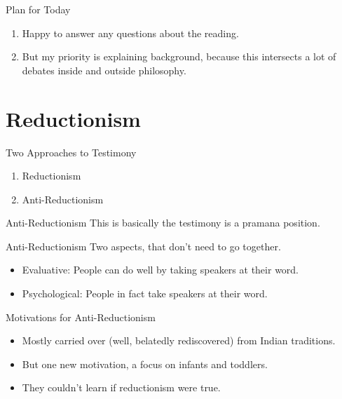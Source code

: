 \documentclass[
  17pt,
  letterpaper,
  ignorenonframetext,
  aspectratio=169,
]{beamer}
\providecommand{\tightlist}{%
  \setlength{\itemsep}{0pt}\setlength{\parskip}{0pt}}\usepackage{longtable,booktabs,array}
\begin{document}
\begin{frame}{Plan for Today}
\protect\hypertarget{plan-for-today}{}
\begin{enumerate}[<+->]
\tightlist
\item
  Happy to answer any questions about the reading.
\item
  But my priority is explaining background, because this intersects a
  lot of debates inside and outside philosophy.
\end{enumerate}
\end{frame}

\hypertarget{reductionism}{%
\section{Reductionism}\label{reductionism}}

\begin{frame}{Two Approaches to Testimony}
\protect\hypertarget{two-approaches-to-testimony}{}
\begin{enumerate}[<+->]
\tightlist
\item
  Reductionism
\item
  Anti-Reductionism
\end{enumerate}
\end{frame}

\begin{frame}{Anti-Reductionism}
\protect\hypertarget{anti-reductionism}{}
This is basically the testimony is a pramana position.
\end{frame}

\begin{frame}{Anti-Reductionism}
\protect\hypertarget{anti-reductionism-1}{}
Two aspects, that don't need to go together.

\begin{itemize}[<+->]
\tightlist
\item
  Evaluative: People can do well by taking speakers at their word.
\item
  Psychological: People in fact take speakers at their word.
\end{itemize}
\end{frame}

\begin{frame}{Motivations for Anti-Reductionism}
\protect\hypertarget{motivations-for-anti-reductionism}{}
\begin{itemize}[<+->]
\tightlist
\item
  Mostly carried over (well, belatedly rediscovered) from Indian
  traditions.
\item
  But one new motivation, a focus on infants and toddlers.
\item
  They couldn't learn if reductionism were true.
\end{itemize}
\end{frame}
\end{document}
